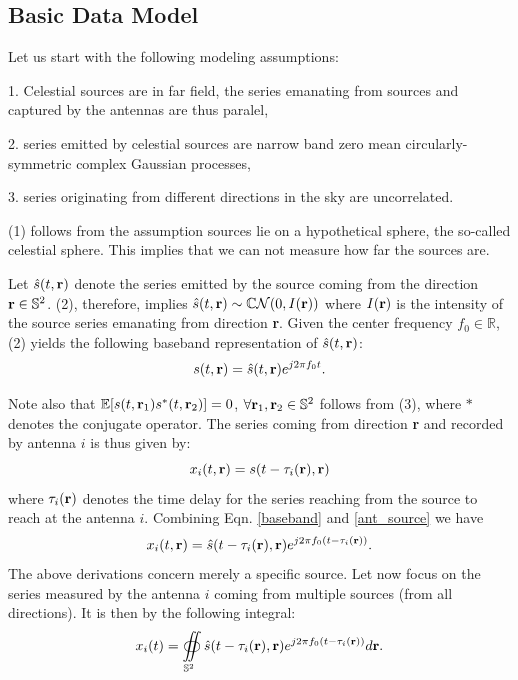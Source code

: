 \documentclass[aoas,preprint]{imsart}
\numberwithin{equation}{section}
\theoremstyle{plain}
\begin{document}
{\subsection{Basic Data Model}

Let us start with the following modeling assumptions:~\cite{perley1999ra}

1. Celestial sources are in far field, the series emanating from sources and captured by the antennas are thus paralel,
  
2.  series emitted by celestial sources are narrow band zero mean circularly-symmetric complex Gaussian processes,
    
3.  series originating from different directions in the sky are uncorrelated.  
  
(1) follows from the assumption sources lie on a hypothetical sphere, the so-called celestial sphere. This implies that we can not measure how far the sources are.
 \vspace{3mm}
 
Let $\hat{s}(t,{\bf r})$ denote the series emitted by the source coming from the direction ${\bf r} \in \mathbb{S}^2$. (2), therefore, implies $\hat{s}(t,{\bf r}) \sim \mathbb{C}\mathcal{N}(0,I(\bf{r}))$ where $I(\bf{r})$ is the intensity of the source series emanating from direction {\bf r}. Given the center frequency $f_0 \in \mathbb{R}$, (2) yields the following baseband representation of $\hat{s}(t,{\bf r})$:
\begin{equation}
 s(t,{\bf r}) = \hat{s}(t,{\bf r})e^{j2\pi f_0t}.\label{baseband}
 \end{equation}
 
Note also that $\mathbb{E}[s(t,{\bf r}_1)s^*(t,{\bf r}_2)] =0$, $\forall {\bf r}_1, {\bf r}_2 \in \mathbb{S}^2$ follows from (3), where $*$ denotes the conjugate operator. 
The series coming from direction {\bf r} and recorded by antenna $i$ is thus given by:
\begin{equation}
x_i(t,{\bf r}) = s(t-\tau_{i}({\bf r}),{\bf r}) \label{ant_source}
\end{equation} 
 where $\tau_i({\bf r})$ denotes the time delay for the series reaching from the source to reach at the antenna $i$. Combining Eqn. \ref{baseband} and \ref{ant_source} we have
 \begin{equation}
 x_i(t,{\bf r}) = \hat{s}(t-\tau_{i}({\bf r}),{\bf r})e^{j2\pi f_0(t-\tau_{i}({\bf r}))}.
 \end{equation}
The above derivations concern merely a specific source. Let now focus on the series measured by the antenna $i$ coming from multiple sources (from all directions). It is then by the following integral:
\begin{equation}
x_i(t) = \oiint \displaylimits_{\mathbb{S}^2} \hat{s}(t-\tau_i({\bf r}), {\bf r})e^{j2\pi f_0(t-\tau_i({\bf r}))}d{\bf r}. \label{int_sour}
\end{equation}
 
}
\end{document}
